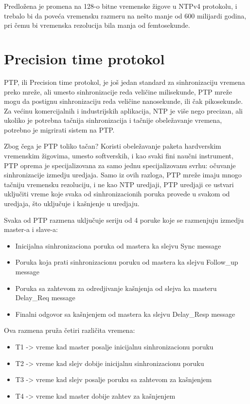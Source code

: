 \documentclass[a4paper,12pt, master]{etf}
\begin{document}
	Predlo\v{z}ena je promena na 128-o bitne vremenske \v{z}igove u NTPv4 protokolu, i trebalo bi da 
	pove\'{c}a vremensku razmeru na ne\v{s}to manje od 600 milijardi godina, pri \v{c}emu bi vremenska 
	rezolucija bila manja od femtosekunde.

	\section{Precision time protokol}

	PTP, ili Precision time protokol, je jo\v{s} jedan standard za sinhronizaciju vremena preko 
	mre\v{z}e, ali umesto sinhronizacije reda veli\v{c}ine milisekunde, PTP mre\v{z}e mogu da postignu 
	sinhronizaciju reda veli\v{c}ine nanosekunde, ili \v{c}ak pikosekunde. Za ve\'{c}inu komercijalnih i 
	industrijskih aplikacija, NTP je vi\v{s}e nego precizan, ali ukoliko je potrebna ta\v{c}nija 
	sinhronizacija i ta\v{c}nije obele\v{z}avanje vremena, potrebno je migrirati sistem na PTP.

	Zbog \v{c}ega je PTP toliko ta\v{c}an? Koristi obele\v{z}avanje paketa hardverskim vremenskim 
	\v{z}igovima, umesto softverskih, i kao svaki fini nau\v{c}ni instrument, PTP oprema je 
	specijalizovana za samo jednu specijalizovanu svrhu: o\v{c}uvanje sinhronizacije izmedju 
	uredjaja. Samo iz ovih razloga, PTP mre\v{z}e imaju mnogo ta\v{c}niju vremensku rezoluciju, i ne 
	kao NTP uredjaji, PTP uredjaji ce ustvari uklju\v{c}iti vreme koje svaka od sinhronizacionih 
	poruka provede u svakom od uredjaja, \v{s}to uklju\v{c}uje i ka\v{s}njenje u uredjaju.

	Svaka od PTP razmena uklju\v{c}uje seriju od 4 poruke koje se razmenjuju izmedju master-a i 
	slave-a:
	\begin{itemize}
		\item Inicijalna sinhronizaciona poruka od mastera ka slejvu {Sync message}
		\item Poruka koja prati sinhronizacionu poruku od mastera ka slejvu {Follow\_up message}
		\item Poruka sa zahtevom za odredjivanje ka\v{s}njenja od slejva ka masteru {Delay\_Req 
		message}
		\item Finalni odgovor sa ka\v{s}njenjem od mastera ka slejvu {Delay\_Resp message}
    \end{itemize}
    
	Ova razmena pru\v{z}a \v{c}etiri razli\v{c}ita vremena:
	\begin{itemize}
		\item T1 -> vreme kad master posalje inicijalnu sinhronizacionu poruku
		\item T2 -> vreme kad slejv dobije inicijalnu sinhronizacionu poruku
		\item T3 -> vreme kad slejv posalje poruku sa zahtevom za ka\v{s}njenjem
		\item T4 -> vreme kad master dobije zahtev za ka\v{s}njenjem
    \end{itemize}
    
\end{document}
